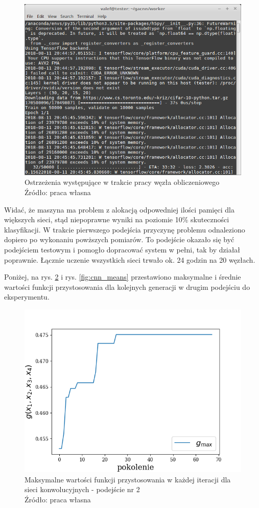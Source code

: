 \begin{figure}[h!tb]
	 \centering
	 \includegraphics[width = 0.9\linewidth]{img/warnings}
	 \caption{Ostrzeżenia występujące w trakcie pracy węzła obliczeniowego  \\
              Źródło: praca własna}
	 \label{fig:warnings}
\end{figure}

Widać, że maszyna ma problem z alokacją odpowedniej ilości pamięci dla większych sieci, stąd niepoprawne wyniki na poziomie 10\% skuteczności klasyfikacji.
W trakcie pierwszego podejścia przyczynę problemu odnaleziono dopiero po wykonaniu powższych pomiarów.
To podejście okazało się być podejściem testowym i pomogło dopracować system w pełni, tak by działał poprawnie.
Łącznie uczenie wszystkich sieci trwało ok. 24 godzin na 20 węzłach.

Poniżej, na rys. \ref{fig:cnn_maxes} i rys. \ref{fig:cnn_means} przestawiono maksymalne i średnie wartości funkcji przystosowania dla kolejnych generacji w drugim podejściu do eksperymentu.
\begin{figure}[h!tb]
	 \centering
	 \includegraphics[width = 0.9\linewidth]{img/cnn_maxes}
	 \caption{Maksymalne wartości funkcji przystosowania w każdej iteracji dla sieci konwolucyjnych - podejście nr 2\\
              Źródło: praca własna}
	 \label{fig:cnn_maxes}
\end{figure}

